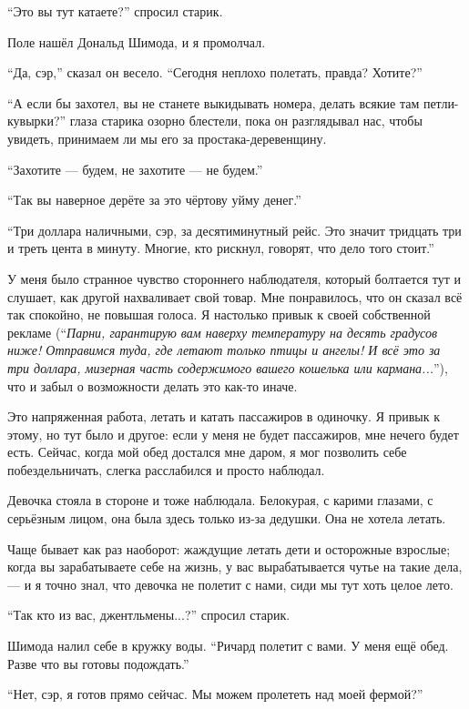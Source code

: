 ``Это вы тут катаете?'' спросил старик.

Поле нашёл Дональд Шимода, и я промолчал.

``Да, сэр,'' сказал он весело. ``Сегодня неплохо полетать, правда? Хотите?''

``А если бы захотел, вы не станете выкидывать номера, делать всякие там петли-кувырки?'' глаза
 старика озорно блестели, пока он разглядывал нас, чтобы увидеть, принимаем ли мы его за
 прос\-та\-ка-де\-ре\-вен\-щи\-ну.

``Захотите --- будем, не захотите --- не будем.''

``Так вы наверное дерёте за это чёртову уйму денег.''

``Три доллара наличными, сэр, за десятиминутный рейс. Это значит тридцать три и треть цента в
 минуту. Многие, кто рискнул, говорят, что дело того стоит.''

У меня было странное чувство стороннего наблюдателя, который болтается тут и слушает, как другой
нахваливает свой товар. Мне понравилось, что он сказал всё так спокойно, не повышая голоса. Я
настолько привык к своей собственной рекламе (``{\sl Парни, гарантирую вам наверху температуру на десять
градусов ниже! Отправимся туда, где летают только птицы и ангелы! И всё это за три доллара,
 мизерная часть содержимого вашего кошелька или кармана...}''), что и забыл о возможности делать это как-то иначе.

Это напряженная работа, летать и катать пассажиров в одиночку. Я привык к этому, но тут было и
 другое: если у меня не будет пассажиров, мне нечего будет есть. Сейчас, когда мой обед достался мне даром, я мог позволить себе побездельничать, слегка расслабился и просто наблюдал.

Девочка стояла в стороне и тоже наблюдала. Белокурая, с карими глазами, с серьёзным лицом, она была здесь только из-за дедушки. Она не хотела летать.

Чаще бывает как раз наоборот: жаждущие летать дети и осторожные взрослые; когда вы зарабатываете себе на жизнь, у вас вырабатывается чутье на такие дела, --- и я точно знал, что девочка не полетит с нами, сиди мы тут хоть целое лето.

``Так кто из вас, джентльмены...?'' спросил старик.

Шимода налил себе в кружку воды.
``Ричард полетит с вами. У меня ещё обед. Разве что вы готовы подождать.''

``Нет, сэр, я готов прямо сейчас. Мы можем пролететь над моей фермой?''

